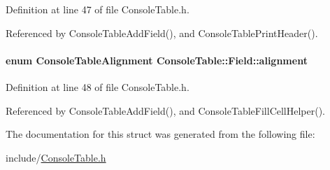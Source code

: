 Definition at line 47 of file ConsoleTable.h.

Referenced by ConsoleTableAddField(), and ConsoleTablePrintHeader().\hypertarget{structConsoleTable_1_1Field_a5b961688b7ae859cdc27f45e0df0ac2}{
\paragraph[alignment]{\setlength{\rightskip}{0pt plus 5cm}enum {\bf ConsoleTableAlignment} {\bf ConsoleTable::Field::alignment}}\hfill}
\label{structConsoleTable_1_1Field_a5b961688b7ae859cdc27f45e0df0ac2}




Definition at line 48 of file ConsoleTable.h.

Referenced by ConsoleTableAddField(), and ConsoleTableFillCellHelper().

The documentation for this struct was generated from the following file:\begin{CompactItemize}
\item 
include/\hyperlink{ConsoleTable_8h}{ConsoleTable.h}\end{CompactItemize}
